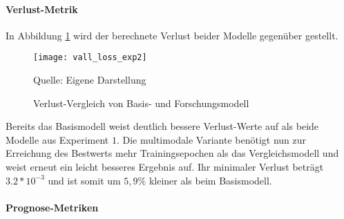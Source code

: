 \paragraph*{Verlust-Metrik} 
In Abbildung \ref{fig:vall_loss_exp2} wird der berechnete Verlust beider Modelle gegenüber gestellt.
\begin{figure}[H]
	\caption{Verlust-Vergleich von Basis- und Forschungsmodell}
	\texttt{[image: vall\_loss\_exp2]}
	\label{fig:vall_loss_exp2}
	\raggedright
	\normalsize{Quelle: Eigene Darstellung}
	\vspace{-1.0em}
\end{figure}
Bereits das Basismodell weist deutlich bessere Verlust-Werte auf als beide Modelle aus Experiment $1$. Die multimodale Variante benötigt nun zur Erreichung des Bestwerts mehr Trainingsepochen als das Vergleichsmodell und weist erneut ein leicht besseres Ergebnis auf. Ihr minimaler Verlust beträgt $3.2*10^{-3}$ und ist somit um $5,9\%$ kleiner als beim Basismodell.

\paragraph*{Prognose-Metriken} 

